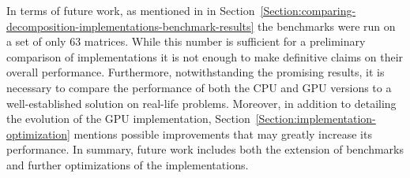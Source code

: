 \par In terms of future work, as mentioned in \textit{} in Section~\ref{Section:comparing-decomposition-implementations-benchmark-results} the benchmarks were run on a set of only 63 matrices. While this number is sufficient for a preliminary comparison of implementations it is not enough to make definitive claims on their overall performance. Furthermore, notwithstanding the promising results, it is necessary to compare the performance of both the CPU and GPU versions to a well-established solution on real-life problems. Moreover, in addition to detailing the evolution of the GPU implementation, Section~\ref{Section:implementation-optimization} \textit{} mentions possible improvements that may greatly increase its performance. In summary, future work includes both the extension of benchmarks and further optimizations of the implementations.